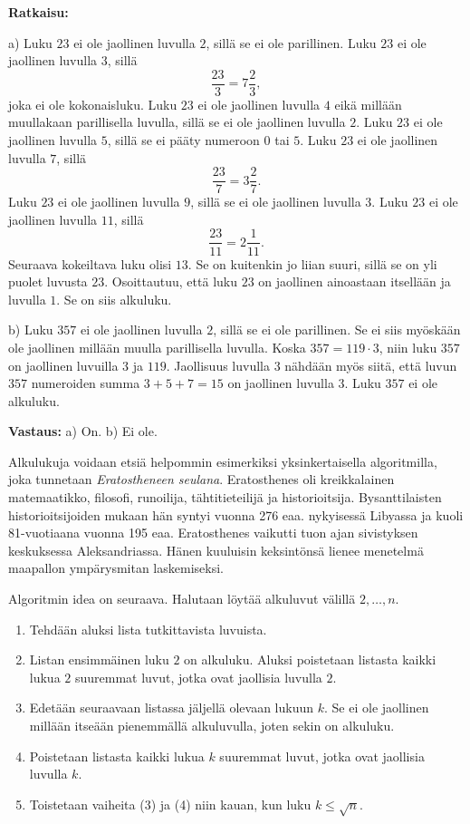 {\bf Ratkaisu:}

a) Luku $23$ ei ole jaollinen luvulla $2$, sillä se ei ole
parillinen. Luku $23$ ei ole jaollinen luvulla $3$, sillä
\[
\frac{23}{3}= 7\frac{2}{3},
\]
joka ei ole kokonaisluku. Luku $23$ ei ole jaollinen luvulla $4$
eikä millään muullakaan parillisella luvulla, sillä se ei ole
jaollinen luvulla $2$. Luku $23$ ei ole
jaollinen luvulla $5$, sillä se ei pääty numeroon $0$ tai $5$.
Luku $23$ ei ole jaollinen luvulla $7$, sillä
\[
\frac{23}{7} = 3\frac{2}{7}.
\]
Luku $23$ ei ole jaollinen luvulla $9$, sillä se ei ole jaollinen
luvulla $3$. Luku $23$ ei ole jaollinen luvulla $11$, sillä
\[
\frac{23}{11} = 2\frac{1}{11}.
\]
Seuraava kokeiltava luku olisi $13$. Se on kuitenkin jo liian
suuri, sillä se on yli puolet luvusta $23$. Osoittautuu, että
luku $23$ on jaollinen ainoastaan itsellään ja luvulla $1$. Se on
siis alkuluku.

b) Luku $357$ ei ole jaollinen luvulla $2$, sillä se ei ole
parillinen. Se ei siis myöskään ole jaollinen millään muulla
parillisella luvulla. Koska $357 = 119 \cdot 3$, niin luku $357$
on jaollinen luvuilla $3$ ja $119$. Jaollisuus luvulla $3$
nähdään myös siitä, että luvun $357$ numeroiden summa $3 + 5 + 7
= 15$ on jaollinen luvulla $3$. Luku $357$ ei ole alkuluku.

{\bf Vastaus:} a) On. b) Ei ole.


Alkulukuja voidaan etsiä helpommin esimerkiksi yksinkertaisella algoritmilla, joka tunnetaan {\em Eratostheneen seulana}. Eratosthenes oli kreikkalainen matemaatikko, filosofi, runoilija, tähtitieteilijä ja historioitsija. Bysanttilaisten historioitsijoiden mukaan hän syntyi vuonna 276 eaa. nykyisessä Libyassa ja kuoli 81-vuotiaana vuonna 195 eaa. Eratosthenes vaikutti tuon ajan sivistyksen keskuksessa Aleksandriassa. Hänen kuuluisin keksintönsä lienee menetelmä maapallon ympärysmitan laskemiseksi. %

Algoritmin idea on seuraava. Halutaan löytää alkuluvut välillä $2,\ldots,n$.
\begin{enumerate}
\item Tehdään aluksi lista tutkittavista luvuista. 
\item Listan ensimmäinen luku $2$ on alkuluku. Aluksi poistetaan listasta kaikki lukua $2$ suuremmat luvut, jotka ovat jaollisia luvulla $2$.
\item Edetään seuraavaan listassa jäljellä olevaan lukuun $k$. Se ei ole jaollinen millään itseään pienemmällä alkuluvulla, joten sekin on alkuluku.
\item Poistetaan listasta kaikki lukua $k$ suuremmat luvut, jotka ovat jaollisia luvulla $k$.
\item Toistetaan vaiheita (3) ja (4) niin kauan, kun luku $k \le \sqrt{n}$. 
\end{enumerate}

